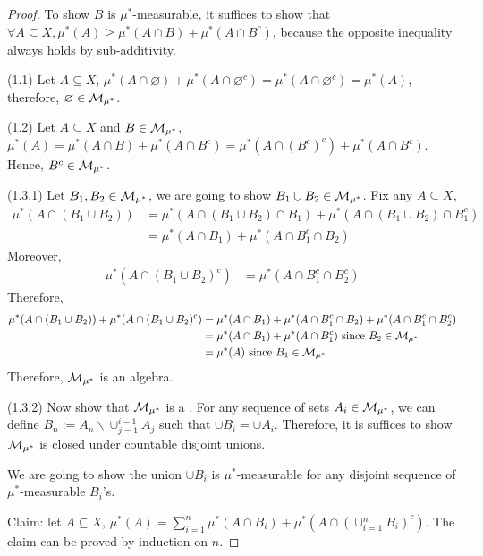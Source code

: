 \documentclass[11pt]{article}
\begin{document}
	\begin{proof}
		To show $B$ is $\mu^*$-measurable, it suffices to show that $\forall A \subseteq X, \mu^*(A) \geq \mu^*(A \cap B) + \mu^*(A \cap B^c)$, because the opposite inequality always holds by sub-additivity.
		
		(1.1) Let $A \subseteq X$, $\mu^*(A \cap \varnothing) + \mu^*(A \cap \varnothing^c) = \mu^*(A \cap \varnothing^c) = \mu^*(A)$, therefore, $\varnothing \in \mathcal{{M}}_{\mu^*}$.
		
		(1.2) Let $A \subseteq X$ and $B \in \mathcal{{M}}_{\mu^*}$, $\mu^*(A) = \mu^*(A \cap B) + \mu^*(A \cap B^c) = \mu^*(A \cap (B^c)^c) + \mu^*(A \cap B^c)$. Hence, $B^c \in \mathcal{{M}}_{\mu^*}$.
		
		(1.3.1) Let $B_1, B_2 \in \mathcal{{M}}_{\mu^*}$, we are going to show $B_1 \cup B_2 \in \mathcal{{M}}_{\mu^*}$.
		Fix any $A \subseteq X$, 
		\begin{align}
			\mu^*(A \cap (B_1 \cup B_2)) &= \mu^*(A \cap (B_1 \cup B_2) \cap B_1) + \mu^*(A \cap (B_1 \cup B_2) \cap B_1^c) \\
			&= \mu^*(A \cap B_1) + \mu^*(A \cap B_1^c \cap B_2)
		\end{align}
		Moreover,
		\begin{align}
			\mu^*(A \cap (B_1 \cup B_2)^c) &= \mu^*(A \cap B_1^c \cap B_2^c)
		\end{align}
		Therefore,
		\begin{align}
			\mu^*(A \cap (B_1 \cup B_2)) + \mu^*(A \cap (B_1 \cup B_2)^c) &= \mu^*(A \cap B_1) + \mu^*(A \cap B_1^c \cap B_2) +  \mu^*(A \cap B_1^c \cap B_2^c) \\
			&= \mu^*(A \cap B_1) + \mu^*(A \cap B_1^c) \text{{ since }} B_2 \in \mathcal{{M}}_{\mu^*} \\
			&= \mu^*(A) \text{{ since }} B_1 \in \mathcal{{M}}_{\mu^*}
		\end{align}
		Therefore, $\mathcal{{M}}_{\mu^*}$ is an algebra.
		
		(1.3.2) Now show that $\mathcal{{M}}_{\mu^*}$ is a \salg. For any sequence of sets $A_i \in \mathcal{{M}}_{\mu^*}$, we can define $B_n := A_n \backslash \cup_{j=1}^{i-1} A_j$ such that $\cup B_i = \cup A_i$.
		Therefore, it is suffices to show $\mathcal{{M}}_{\mu^*}$ is closed under countable disjoint unions.
		
		We are going to show the union $\cup B_i$ is $\mu^*$-measurable for any disjoint sequence of $\mu^*$-measurable $B_i$'s.
		
		Claim: let $A \subseteq X$, $\mu^*(A) = \sum_{i=1}^n \mu^*(A \cap B_i) + \mu^*(A \cap (\cup_{i=1}^n B_i)^c)$.
		The claim can be proved by induction on $n$.
		

\end{proof}
\end{document}
